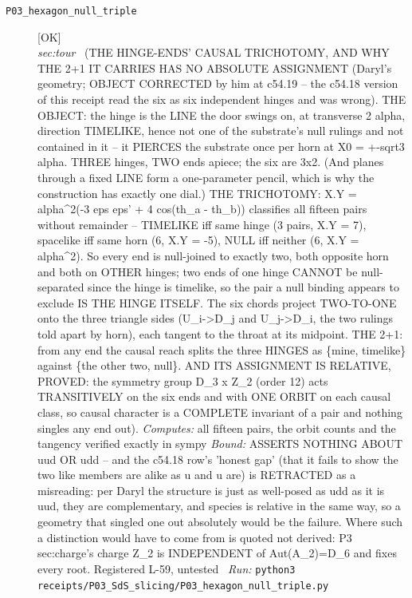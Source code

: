 \begin{description}
\item[\label{rcpt:P03_hexagon_null_triple}\texttt{P03\_hexagon\_null\_triple}]\hfill\textsf{[OK]}\\
\textit{sec:tour} \ (THE HINGE-ENDS' CAUSAL TRICHOTOMY, AND WHY THE 2+1 IT CARRIES HAS NO ABSOLUTE ASSIGNMENT (Daryl's geometry; OBJECT CORRECTED by him at c54.19 -- the c54.18 version of this receipt read the six as six independent hinges and was wrong). THE OBJECT: the hinge is the LINE the door swings on, at transverse 2 alpha, direction TIMELIKE, hence not one of the substrate's null rulings and not contained in it -- it PIERCES the substrate once per horn at X0 = +-sqrt3 alpha. THREE hinges, TWO ends apiece; the six are 3x2. (And planes through a fixed LINE form a one-parameter pencil, which is why the construction has exactly one dial.) THE TRICHOTOMY: X.Y = alpha\textasciicircum{}2(-3 eps eps' + 4 cos(th\_a - th\_b)) classifies all fifteen pairs without remainder -- TIMELIKE iff same hinge (3 pairs, X.Y = 7), spacelike iff same horn (6, X.Y = -5), NULL iff neither (6, X.Y = alpha\textasciicircum{}2). So every end is null-joined to exactly two, both opposite horn and both on OTHER hinges; two ends of one hinge CANNOT be null-separated since the hinge is timelike, so the pair a null binding appears to exclude IS THE HINGE ITSELF. The six chords project TWO-TO-ONE onto the three triangle sides (U\_i->D\_j and U\_j->D\_i, the two rulings told apart by horn), each tangent to the throat at its midpoint. THE 2+1: from any end the causal reach splits the three HINGES as \{mine, timelike\} against \{the other two, null\}. AND ITS ASSIGNMENT IS RELATIVE, PROVED: the symmetry group D\_3 x Z\_2 (order 12) acts TRANSITIVELY on the six ends and with ONE ORBIT on each causal class, so causal character is a COMPLETE invariant of a pair and nothing singles any end out). 
\emph{Computes:} all fifteen pairs, the orbit counts and the tangency verified exactly in sympy
 \emph{Bound:} ASSERTS NOTHING ABOUT uud OR udd -- and the c54.18 row's 'honest gap' (that it fails to show the two like members are alike as u and u are) is RETRACTED as a misreading: per Daryl the structure is just as well-posed as udd as it is uud, they are complementary, and species is relative in the same way, so a geometry that singled one out absolutely would be the failure. Where such a distinction would have to come from is quoted not derived: P3 sec:charge's charge Z\_2 is INDEPENDENT of Aut(A\_2)=D\_6 and fixes every root. Registered L-59, untested
\ \emph{Run:} \texttt{python3 receipts/P03\_SdS\_slicing/P03\_hexagon\_null\_triple.py}

\end{description}
